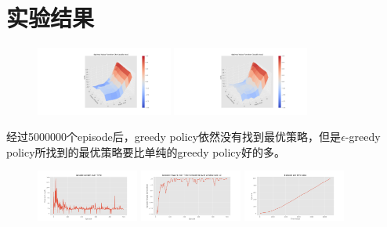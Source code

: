 \documentclass{ctexart}
\begin{document}
\section{实验结果}

\begin{figure}[H]
    \centering
    \includegraphics[width=0.4\textwidth]{m1.png}
    \includegraphics[width=0.4\textwidth]{m2.png}
\end{figure}

经过5000000个episode后，greedy policy依然没有找到最优策略，但是$\epsilon$-greedy policy所找到的最优策略要比单纯的greedy policy好的多。

\begin{figure}[H]
    \centering
    \includegraphics[width=0.3\textwidth]{s1.png}
    \includegraphics[width=0.3\textwidth]{s2.png}
    \includegraphics[width=0.3\textwidth]{s3.png}
\end{figure}
\end{document}
